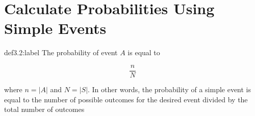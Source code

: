 \section{Calculate Probabilities Using Simple Events}

\begin{definition}{def3.2:label}
    The probability of event $A$ is equal to 

    $$
    \frac{n}{N}
    $$

    where $n = |A|$ and $N = |S|$. In other words, the probability of a simple event is equal to the number of possible outcomes for the desired event divided by the total number of outcomes
\end{definition}
